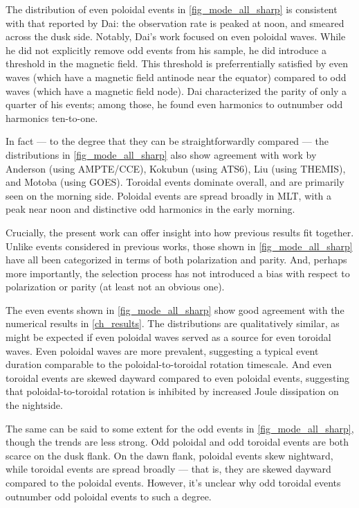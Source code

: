The distribution of even poloidal events in \cref{fig_mode_all_sharp} is consistent with that reported by Dai\cite{dai_2015}: the observation rate is peaked at noon, and smeared across the dusk side. Notably, Dai's work focused on even poloidal waves. While he did not explicitly remove odd events from his sample, he did introduce a threshold in the magnetic field. This threshold is preferrentially satisfied by even waves (which have a magnetic field antinode near the equator) compared to odd waves (which have a magnetic field node). Dai characterized the parity of only a quarter of his events; among those, he found even harmonics to outnumber odd harmonics ten-to-one. 

In fact --- to the degree that they can be straightforwardly compared --- the distributions in \cref{fig_mode_all_sharp} also show agreement with work by Anderson\cite{anderson_1990} (using AMPTE/CCE), Kokubun\cite{kokubun_1989} (using ATS6), Liu\cite{liu_2009} (using THEMIS), and Motoba\cite{motoba_2015} (using GOES). Toroidal events dominate overall, and are primarily seen on the morning side. Poloidal events are spread broadly in MLT, with a peak near noon and distinctive odd harmonics in the early morning. 

Crucially, the present work can offer insight into how previous results fit together. Unlike events considered in previous works, those shown in \cref{fig_mode_all_sharp} have all been categorized in terms of both polarization and parity. And, perhaps more importantly, the selection process has not introduced a bias with respect to polarization or parity (at least not an obvious one). 

The even events shown in \cref{fig_mode_all_sharp} show good agreement with the numerical results in \cref{ch_results}. The distributions are qualitatively similar, as might be expected if even poloidal waves served as a source for even toroidal waves. Even poloidal waves are more prevalent, suggesting a typical event duration comparable to the poloidal-to-toroidal rotation timescale. And even toroidal events are skewed dayward compared to even poloidal events, suggesting that poloidal-to-toroidal rotation is inhibited by increased Joule dissipation on the nightside. 

The same can be said to some extent for the odd events in \cref{fig_mode_all_sharp}, though the trends are less strong. Odd poloidal and odd toroidal events are both scarce on the dusk flank. On the dawn flank, poloidal events skew nightward, while toroidal events are spread broadly --- that is, they are skewed dayward compared to the poloidal events. However, it's unclear why odd toroidal events outnumber odd poloidal events to such a degree. 





